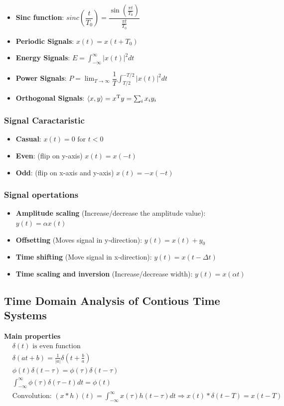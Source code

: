 \begin{itemize}
    \item \textbf{Sinc function}: $sinc(\dfrac{t}{T_0})=\dfrac{\sin(\frac{\pi t}{T_0})}{\frac{\pi t}{T_0}}$
    \item \textbf{Periodic Signals}: $x(t)=x(t+T_0)$
    \item \textbf{Energy Signals}: $E=\int_{-\infty}^{\infty}|x(t)|^2dt$
    \item \textbf{Power Signals}: $P=\lim_{T\to\infty}\dfrac{1}{T}\int_{T/2}^{-T/2}|x(t)|^2dt$
    \item \textbf{Orthogonal Signals}: $\langle x,y \rangle = x^{\mathrm{T}} y = \sum_i x_i y_i$
\end{itemize}

\subsubsection{Signal Caractaristic}
\begin{itemize}
    \item \textbf{Casual}: $x(t)=0 \text{ for } t<0$
    \item \textbf{Even}: (flip on y-axis) $x(t)=x(-t)$
    \item \textbf{Odd}: (flip on x-axis and y-axis) $x(t)=-x(-t)$
\end{itemize}


\subsubsection{Signal opertations}
\begin{itemize}
    \item \textbf{Amplitude scaling} (Increase/decrease the amplitude value): $y(t)=\alpha x(t)$
    \item \textbf{Offsetting} (Moves signal in y-direction): $y(t)=x(t)+y_0$
    \item \textbf{Time shifting} (Move signal in x-direction): $y(t)=x(t-\Delta t)$
    \item \textbf{Time scaling and inversion} (Increase/decrease width): $y(t) = x(\alpha t)$
\end{itemize}


\subsection{Time Domain Analysis of Contious Time Systems}
\textbf{Main properties}
\begin{align*}
    &\delta(t) \text{ is even function} \\
    &\delta(at+b) = \frac{1}{|a|}\delta(t+\frac{b}{a}) \\
    &\phi(t)\delta(t-\tau) = \phi(\tau)\delta(t-\tau) \\
    &\int_{-\infty}^{\infty}\phi(\tau)\delta(\tau-t)dt = \phi(t) \\
    &\text{Convolution: } (x*h)(t) = \int_{-\infty}^{\infty}x(\tau)h(t-\tau)dt 
    \Rightarrow x(t)*\delta(t-T)=x(t-T) \\
\end{align*}

